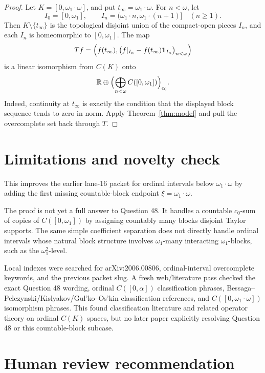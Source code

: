 \documentclass[11pt]{article}
\newcommand{\R}{\mathbb R}
\newcommand{\one}{\mathbf 1}
\begin{document}
\begin{proof}
Let \(K=[0,\omega_1\cdot\omega]\), and put \(t_\infty=\omega_1\cdot\omega\).
For \(n<\omega\), let
\[
   I_0=[0,\omega_1],
   \qquad
   I_n=(\omega_1\cdot n,\omega_1\cdot(n+1)]\quad(n\geq1).
\]
Then \(K\setminus\{t_\infty\}\) is the topological disjoint union of the
compact-open pieces \(I_n\), and each \(I_n\) is homeomorphic to
\([0,\omega_1]\).  The map
\[
   Tf=\Bigl(f(t_\infty),
       \bigl(f|_{I_n}-f(t_\infty)\one_{I_n}\bigr)_{n<\omega}\Bigr)
\]
is a linear isomorphism from \(C(K)\) onto
\[
   \R\oplus\Bigl(\bigoplus_{n<\omega} C([0,\omega_1])\Bigr)_{c_0}.
\]
Indeed, continuity at \(t_\infty\) is exactly the condition that the displayed
block sequence tends to zero in norm.  Apply Theorem~\ref{thm:model} and
pull the overcomplete set back through \(T\).
\end{proof}

\section{Limitations and novelty check}

This improves the earlier lane-16 packet for ordinal intervals below
\(\omega_1\cdot\omega\) by adding the first missing countable-block endpoint
\(\xi=\omega_1\cdot\omega\).

The proof is not yet a full answer to Question 48.  It handles a countable
\(c_0\)-sum of copies of \(C([0,\omega_1])\) by assigning countably many
blocks disjoint Taylor supports.  The same simple coefficient separation does
not directly handle ordinal intervals whose natural block structure involves
\(\omega_1\)-many interacting \(\omega_1\)-blocks, such as the
\(\omega_1^2\)-level.

Local indexes were searched for arXiv:2006.00806, ordinal-interval
overcomplete keywords, and the previous packet slug.  A fresh web/literature
pass checked the exact Question 48 wording, ordinal \(C([0,\alpha])\)
classification phrases, Bessaga--Pelczynski/Kislyakov/Gul'ko--Os'kin
classification references, and \(C([0,\omega_1\cdot\omega])\) isomorphism
phrases.  This found classification literature and related operator theory on
ordinal \(C(K)\) spaces, but no later paper explicitly resolving Question 48
or this countable-block subcase.

\section{Human review recommendation}
\end{document}

